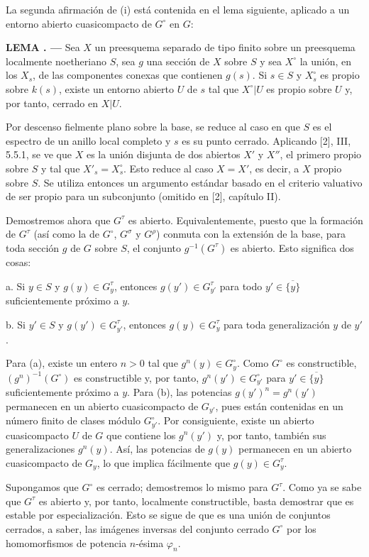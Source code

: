 \documentclass[11pt,twoside,openany]{book}
\numberwithin{equation}{section}
\newcommand{\src}[1]{%
  \phantomsection\hypertarget{src:#1}{}%
  \marginpar{\raggedleft\footnotesize\sffamily #1}%
}
\theoremstyle{plain}
\theoremstyle{definition}
\theoremstyle{remark}
\newcommand{\result}[2]{%
  \par\medskip\noindent\textbf{#1%
  \if\relax\detokenize{#2}\relax\else\space#2\fi. ---}\enspace
}
\newcommand{\FgaUnitKey}{frontmatter}
\renewcommand{\src}[1]{%
  \phantomsection\hypertarget{src:\FgaUnitKey:#1}{}%
  \marginpar{\raggedleft\footnotesize\sffamily #1}%
}
\theoremstyle{plain}
\theoremstyle{definition}
\theoremstyle{remark}
\begin{document}
La segunda afirmación de (i) está contenida en el lema siguiente, aplicado a
un entorno abierto cuasicompacto de $G^\circ$ en $G$:

\result{LEMA}{1.3} Sea $X$ un preesquema separado de tipo finito sobre un
preesquema localmente noetheriano $S$, sea $g$ una sección de $X$ sobre $S$ y
sea $X^\circ$ la unión, en los $X_s$, de las componentes conexas que contienen
$g(s)$. Si $s\in S$ y $X_s^\circ$ es propio sobre $k(s)$, existe un entorno
abierto $U$ de $s$ tal que $X^\circ|U$ es propio sobre $U$ y, por tanto,
cerrado en $X|U$.

Por descenso fielmente plano sobre la base, se reduce al caso en que $S$ es el
espectro de un anillo local completo y $s$ es su punto cerrado. Aplicando [2],
III, 5.5.1, se ve que $X$ es la unión disjunta de dos abiertos $X'$ y $X''$, el
primero propio sobre $S$ y tal que $X'_s=X_s^\circ$. Esto reduce al caso
$X=X'$, es decir, a $X$ propio sobre $S$. Se utiliza entonces un argumento
estándar basado en el criterio valuativo de ser propio para un subconjunto
(omitido en [2], capítulo II).

Demostremos ahora que $G^\tau$ es abierto. Equivalentemente, puesto que la
formación de $G^\tau$ (así como la de $G^\circ$, $G^\sigma$ y $G^\rho$) conmuta
con la extensión de la base, para toda sección $g$ de $G$ sobre $S$, el
conjunto $g^{-1}(G^\tau)$ es abierto. Esto significa dos cosas:

\medskip
\noindent a. Si $y\in S$ y $g(y)\in G_y^\tau$, entonces
$g(y')\in G_{y'}^\tau$ para todo $y'\in\overline{\{y\}}$ suficientemente
próximo a $y$.

\medskip
\noindent b. Si $y'\in S$ y $g(y')\in G_{y'}^\tau$, entonces
$g(y)\in G_y^\tau$ para toda generalización $y$ de $y'$.

Para (a), existe un entero $n>0$ tal que $g^n(y)\in G_y^\circ$. Como
$G^\circ$ es constructible, $(g^n)^{-1}(G^\circ)$ es constructible y, por
tanto, $g^n(y')\in G_{y'}^\circ$ para
$y'\in\overline{\{y\}}$ suficientemente próximo a $y$. Para (b), las
potencias $g(y')^n=g^n(y')$ permanecen en un abierto cuasicompacto de
$G_{y'}$, pues están contenidas en un número finito de clases módulo
$G_{y'}^\circ$. Por consiguiente, existe un abierto cuasicompacto $U$ de $G$
que contiene los $g^n(y')$ y, por tanto, también sus generalizaciones
$g^n(y)$. Así, las potencias de $g(y)$ permanecen en un abierto cuasicompacto
de $G_y$, lo que implica fácilmente que $g(y)\in G_y^\tau$.

\src{226}
Supongamos que $G^\circ$ es cerrado; demostremos lo mismo para $G^\tau$. Como
ya se sabe que $G^\tau$ es abierto y, por tanto, localmente constructible,
basta demostrar que es estable por especialización. Esto se sigue de que es
una unión de conjuntos cerrados, a saber, las imágenes inversas del conjunto
cerrado $G^\circ$ por los homomorfismos de potencia $n$-ésima $\varphi_n$.
\end{document}
